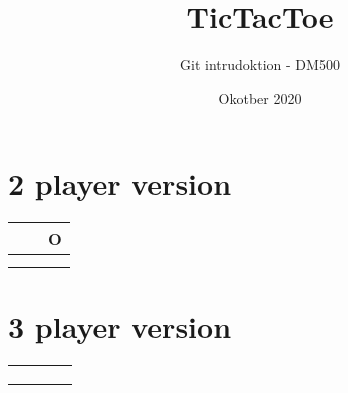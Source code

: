 \documentclass[20pt]{article}
\title{TicTacToe}
\author{Git intrudoktion - DM500}
\date{Okotber 2020}
\begin{document}
\maketitle

\section*{2 player version}

\setlength{\tabcolsep}{20pt}
\renewcommand{\arraystretch}{4}

\begin{table}[h]
\Large
    \centering
\begin{tabular}{ |m{2cm}|m{2cm}|m{2cm}|}
\hline

  &   &  O \\ \hline
  &   &   \\ \hline
  &   &   \\ \hline
\end{tabular}

\end{table}

\newpage

\section*{3 player version}

\setlength{\tabcolsep}{14pt}
\renewcommand{\arraystretch}{5}

\begin{table}[h]
\large
    \centering
\begin{tabular}{ |m{2cm}|m{2cm}|m{2cm}|m{2cm}|}
\hline
  &   &   &   \\ \hline
  &   &   &   \\ \hline
  &   &   &   \\ \hline
  &   &   &   \\ \hline

\end{tabular}

\end{table}
\end{document}
